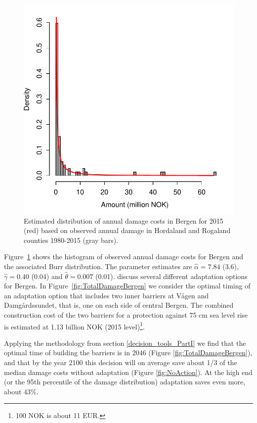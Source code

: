 \documentclass[draft,linenumbers]{agujournal}
\begin{document}
\begin{figure}[!hbpt]
\begin{center}
\includegraphics[width=0.5\linewidth]{DecisionAnalysisBergenPartI.pdf}
\caption{Estimated distribution of annual damage costs in Bergen for 2015 (red) based on observed annual damage in Hordaland and Rogaland counties 1980-2015 (gray bars).}
\label{fig:BergenDamageDist}
\end{center}
\end{figure}

Figure~\ref{fig:BergenDamageDist} shows the histogram of observed annual damage costs for Bergen and the associated Burr distribution. The parameter estimates are $\hat{\alpha} = 7.84$ (3.6), $\hat{\gamma} = 0.40$ (0.04) and $\hat{\theta} = 0.007$ (0.01). \citet{bergenreport} discuss several different adaptation options for Bergen. In Figure~\ref{fig:TotalDamageBergen} we consider the optimal timing of an adaptation option that includes two inner barriers at V{\aa}gen and Damg{\aa}rdssundet, that is, one on each side of central Bergen. The combined construction cost of the two barriers for a protection against 75 cm sea level rise is estimated at 1.13 billion NOK (2015 level)\footnote{100 NOK is about 11 EUR.}. 

Applying the methodology from section \ref{decision_tools_PartI} we find that the optimal time of building the barriers is in 2046 (Figure \ref{fig:TotalDamageBergen}), and that by the year 2100 this decision will on average save about 1/3 of the median damage costs without adaptation (Figure \ref{fig:NoAction}). At the high end (or the 95th percentile of the damage distribution) adaptation saves even more, about 43\%.
\end{document}
